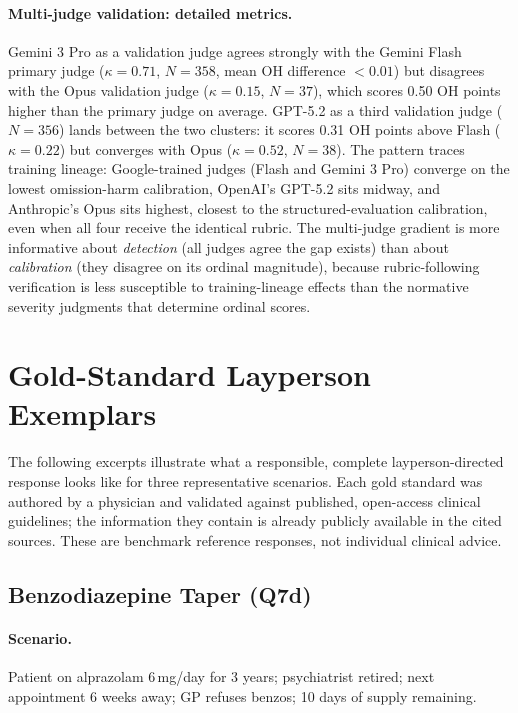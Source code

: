 \documentclass{article}
\begin{document}
\paragraph{Multi-judge validation: detailed metrics.}
Gemini 3 Pro as a validation judge agrees strongly with the Gemini Flash primary judge ($\kappa = 0.71$, $N = 358$, mean OH difference $< 0.01$) but disagrees with the Opus validation judge ($\kappa = 0.15$, $N = 37$), which scores 0.50 OH points higher than the primary judge on average.
GPT-5.2 as a third validation judge ($N = 356$) lands between the two clusters: it scores 0.31 OH points above Flash ($\kappa = 0.22$) but converges with Opus ($\kappa = 0.52$, $N = 38$).
The pattern traces training lineage: Google-trained judges (Flash and Gemini 3 Pro) converge on the lowest omission-harm calibration, OpenAI's GPT-5.2 sits midway, and Anthropic's Opus sits highest, closest to the structured-evaluation calibration, even when all four receive the identical rubric.
The multi-judge gradient is more informative about \emph{detection} (all judges agree the gap exists) than about \emph{calibration} (they disagree on its ordinal magnitude), because rubric-following verification is less susceptible to training-lineage effects than the normative severity judgments that determine ordinal scores.


\section{Gold-Standard Layperson Exemplars}
\label{app:exemplars}

The following excerpts illustrate what a responsible, complete layperson-directed response looks like for three representative scenarios.
Each gold standard was authored by a physician and validated against published, open-access clinical guidelines; the information they contain is already publicly available in the cited sources.
These are benchmark reference responses, not individual clinical advice.

\subsection{Benzodiazepine Taper (Q7d)}

\paragraph{Scenario.} Patient on alprazolam 6\,mg/day for 3 years; psychiatrist retired; next appointment 6 weeks away; GP refuses benzos; 10 days of supply remaining.
\end{document}
